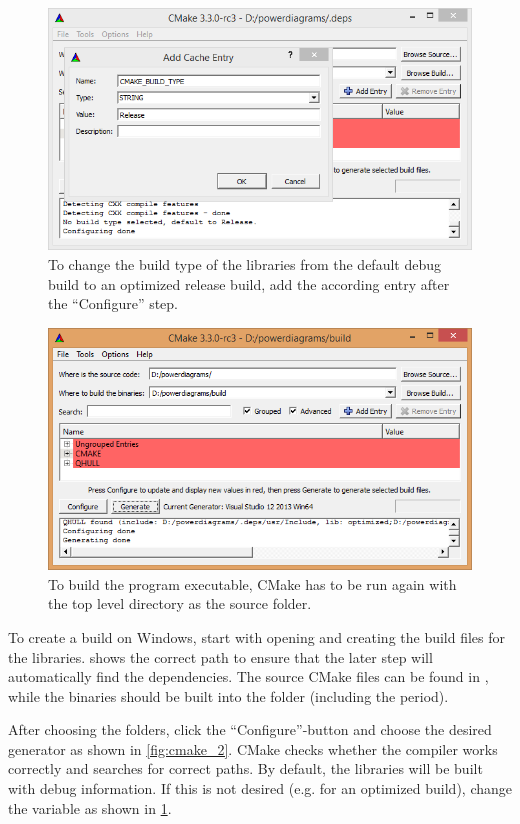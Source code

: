 \begin{figure}[p]
    \centering
    \includegraphics[width=0.9\linewidth]{cmake_3.png}
    \caption{To change the build type of the libraries from the default debug build to an optimized release build, add the according entry after the \enquote{Configure} step.}
    \label{fig:cmake_3}
\end{figure}
\begin{figure}[p]
    \centering
    \includegraphics[width=0.9\linewidth]{cmake_4.png}
    \caption{To build the program executable, CMake has to be run again with the top level directory as the source folder.}
    \label{fig:cmake_4}
\end{figure}

To create a build on Windows, start with opening  and creating the build files for the libraries.
 shows the correct path to ensure that the later step will automatically find the dependencies.
The source CMake files can be found in , while the binaries should be built into the folder  (including the period).

After choosing the folders, click the \enquote{Configure}-button and choose the desired generator as shown in \cref{fig:cmake_2}.
CMake checks whether the compiler works correctly and searches for correct paths.
By default, the libraries will be built with debug information.
If this is not desired (e.g. for an optimized build), change the  variable as shown in \cref{fig:cmake_3}.

